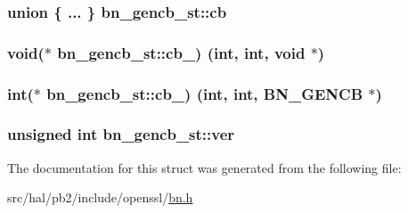 \subsubsection[{\texorpdfstring{cb}{cb}}]{\setlength{\rightskip}{0pt plus 5cm}union \{ ... \}   bn\+\_\+gencb\+\_\+st\+::cb}\hypertarget{structbn__gencb__st_a74fbfbe48965d4f55193f8b8f16ff51b}{}\label{structbn__gencb__st_a74fbfbe48965d4f55193f8b8f16ff51b}
\subsubsection[{\texorpdfstring{cb\+\_\+1}{cb_1}}]{\setlength{\rightskip}{0pt plus 5cm}void($\ast$ bn\+\_\+gencb\+\_\+st\+::cb\+\_) (int, int, void $\ast$)}\hypertarget{structbn__gencb__st_a34c3aa08f7f2f557fb7a51190673bec5}{}\label{structbn__gencb__st_a34c3aa08f7f2f557fb7a51190673bec5}
\subsubsection[{\texorpdfstring{cb\+\_\+2}{cb_2}}]{\setlength{\rightskip}{0pt plus 5cm}int($\ast$ bn\+\_\+gencb\+\_\+st\+::cb\+\_) (int, int, {\bf B\+N\+\_\+\+G\+E\+N\+CB} $\ast$)}\hypertarget{structbn__gencb__st_a1460b7f2b52f128a2db8b8d6380e42cf}{}\label{structbn__gencb__st_a1460b7f2b52f128a2db8b8d6380e42cf}
\subsubsection[{\texorpdfstring{ver}{ver}}]{\setlength{\rightskip}{0pt plus 5cm}unsigned int bn\+\_\+gencb\+\_\+st\+::ver}\hypertarget{structbn__gencb__st_a1c1ac893bd1f6ea3fcfa831fda085086}{}\label{structbn__gencb__st_a1c1ac893bd1f6ea3fcfa831fda085086}


The documentation for this struct was generated from the following file\+:\begin{DoxyCompactItemize}
\item 
src/hal/pb2/include/openssl/\hyperlink{bn_8h}{bn.\+h}\end{DoxyCompactItemize}
